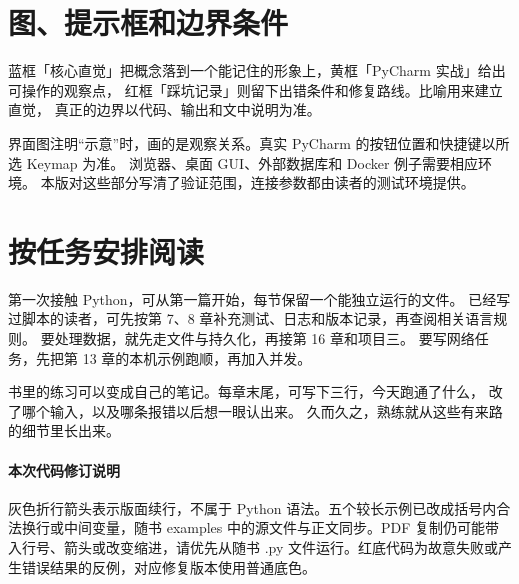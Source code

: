 \section*{图、提示框和边界条件}

蓝框「核心直觉」把概念落到一个能记住的形象上，黄框「PyCharm 实战」给出可操作的观察点，
红框「踩坑记录」则留下出错条件和修复路线。比喻用来建立直觉，
真正的边界以代码、输出和文中说明为准。

界面图注明“示意”时，画的是观察关系。真实 PyCharm 的按钮位置和快捷键以所选 Keymap 为准。
浏览器、桌面 GUI、外部数据库和 Docker 例子需要相应环境。
本版对这些部分写清了验证范围，连接参数都由读者的测试环境提供。

\section*{按任务安排阅读}

第一次接触 Python，可从第一篇开始，每节保留一个能独立运行的文件。
已经写过脚本的读者，可先按第 7、8 章补充测试、日志和版本记录，再查阅相关语言规则。
要处理数据，就先走文件与持久化，再接第 16 章和项目三。
要写网络任务，先把第 13 章的本机示例跑顺，再加入并发。

书里的练习可以变成自己的笔记。每章末尾，可写下三行，今天跑通了什么，
改了哪个输入，以及哪条报错以后想一眼认出来。
久而久之，熟练就从这些有来路的细节里长出来。

\paragraph{本次代码修订说明} 灰色折行箭头表示版面续行，不属于 Python 语法。五个较长示例已改成括号内合法换行或中间变量，随书 examples 中的源文件与正文同步。PDF 复制仍可能带入行号、箭头或改变缩进，请优先从随书 .py 文件运行。红底代码为故意失败或产生错误结果的反例，对应修复版本使用普通底色。
